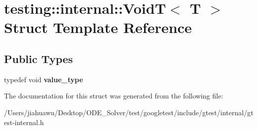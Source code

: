 \hypertarget{structtesting_1_1internal_1_1_void_t}{}\section{testing\+:\+:internal\+:\+:VoidT$<$ T $>$ Struct Template Reference}
\label{structtesting_1_1internal_1_1_void_t}
\subsection*{Public Types}
\begin{DoxyCompactItemize}
\item 
\mbox{\label{structtesting_1_1internal_1_1_void_t_a29e6a3f3989ddb47103944b350f1bec0}} 
typedef void {\bfseries value\+\_\+type}
\end{DoxyCompactItemize}


The documentation for this struct was generated from the following file\+:\begin{DoxyCompactItemize}
\item 
/\+Users/jiahuawu/\+Desktop/\+O\+D\+E\+\_\+\+Solver/test/googletest/include/gtest/internal/gtest-\/internal.\+h\end{DoxyCompactItemize}
